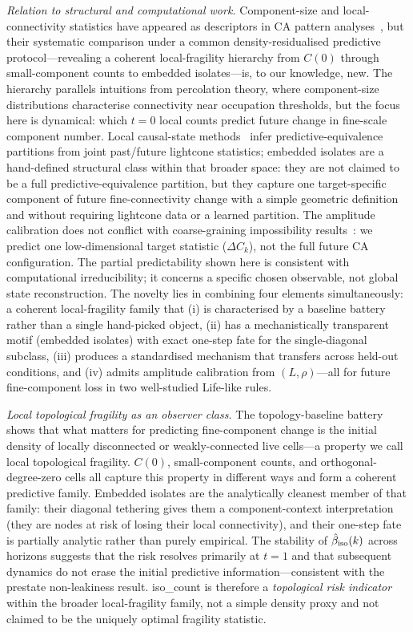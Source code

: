 \documentclass[aip,cha,preprint,nofootinbib]{revtex4-2}
\newcommand{\iso}{{\rm iso}}
\newcommand{\Ck}{\Delta C_k}
\newcommand{\biso}{\hat{\beta}_{\iso}}
\begin{document}
\textit{Relation to structural and computational work.}
Component-size and local-connectivity statistics have appeared as descriptors
in CA pattern analyses~\cite{rupe2018}, but their systematic comparison under
a common density-residualised predictive protocol---revealing a coherent
local-fragility hierarchy from $C(0)$ through small-component counts to
embedded isolates---is, to our knowledge, new.
The hierarchy parallels intuitions from percolation theory, where
component-size distributions characterise connectivity near occupation
thresholds, but the focus here is dynamical: which $t{=}0$ local counts
predict future change in fine-scale component number.
Local causal-state methods~\cite{crutchfield1989,rupe2018} infer
predictive-equivalence partitions from joint past/future lightcone statistics;
embedded isolates are a hand-defined structural class within that broader space:
they are not claimed to be a full predictive-equivalence partition,
but they capture one target-specific component of future fine-connectivity
change with a simple geometric definition and without requiring lightcone
data or a learned partition.
The amplitude calibration does not conflict with coarse-graining impossibility
results~\cite{israeli2004}: we predict one low-dimensional target statistic
($\Ck$), not the full future CA configuration.
The partial predictability shown here is consistent with computational
irreducibility; it concerns a specific chosen observable, not global
state reconstruction.
The novelty lies in combining four elements simultaneously: a coherent
local-fragility family that (i) is characterised by a baseline battery
rather than a single hand-picked object, (ii) has a mechanistically
transparent motif (embedded isolates) with exact one-step fate for the
single-diagonal subclass, (iii) produces a standardised mechanism that
transfers across held-out conditions, and (iv) admits amplitude calibration
from $(L,\rho)$---all for future fine-component loss in two well-studied
Life-like rules.

\textit{Local topological fragility as an observer class.}
The topology-baseline battery shows that what matters for predicting
fine-component change is the initial density of locally disconnected or
weakly-connected live cells---a property we call local topological fragility.
$C(0)$, small-component counts, and orthogonal-degree-zero cells all
capture this property in different ways and form a coherent predictive
family.
Embedded isolates are the analytically cleanest member of that family:
their diagonal tethering gives them a component-context interpretation
(they are nodes at risk of losing their local connectivity), and their
one-step fate is partially analytic rather than purely empirical.
The stability of $\biso(k)$ across horizons suggests that the risk resolves
primarily at $t=1$ and that subsequent dynamics do not erase the initial
predictive information---consistent with the prestate non-leakiness result.
iso\_count is therefore a \emph{topological risk indicator} within the
broader local-fragility family, not a simple density proxy and not claimed
to be the uniquely optimal fragility statistic.
\end{document}
